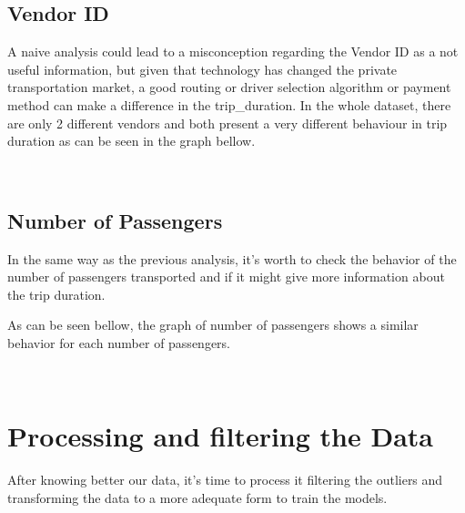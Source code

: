 \documentclass[11pt]{article}
\begin{document}
\subsection{Vendor ID} 

\hspace{0.5cm} A naive analysis could lead to a misconception regarding the Vendor ID as a not useful information, but given that technology has changed the private transportation market, a good routing or driver selection algorithm or payment method can make a difference in the trip\_duration. In the whole dataset, there are only 2 different vendors and both present a very different behaviour in trip duration as can be seen in the graph bellow.

    \begin{center}
    \end{center}
    { \hspace*{\fill} \\}
    
\subsection{Number of Passengers} 

\hspace{0.5cm}In the same way as the previous analysis, it's worth to check the behavior of the number of passengers transported and if it might give more information about the trip duration.

As can be seen bellow, the graph of number of passengers shows a similar behavior for each number of passengers.

    \begin{center}
    \end{center}
    { \hspace*{\fill} \\}
    
\section{Processing and filtering the Data}

\hspace{0.5cm} After knowing better our data, it's time to process it filtering the outliers and transforming the data to a more adequate form to train the models.
\end{document}
